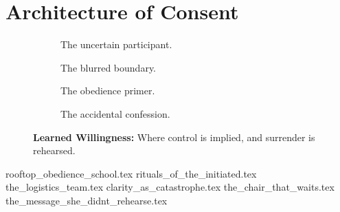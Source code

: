 \section{Architecture of Consent}

\vfill

\begin{figure}[H]
    \centering

    \begin{subfigure}[t]{0.45\textwidth}
    \centering
    \caption*{The uncertain participant.}
    \end{subfigure}
    \hfill
    \begin{subfigure}[t]{0.45\textwidth}
    \centering
    \caption*{The blurred boundary.}
    \end{subfigure}

    \vspace{1em}

    \begin{subfigure}[t]{0.45\textwidth}
    \centering
    \caption*{The obedience primer.}
    \end{subfigure}
    \hfill
    \begin{subfigure}[t]{0.45\textwidth}
    \centering
    \caption*{The accidental confession.}
    \end{subfigure}

    \caption*{\textbf{Learned Willingness:} Where control is implied, and surrender is rehearsed.}
\end{figure}



{rooftop_obedience_school.tex}
{rituals_of_the_initiated.tex}
{the_logistics_team.tex}
{clarity_as_catastrophe.tex}
{the_chair_that_waits.tex}
{the_message_she_didnt_rehearse.tex}